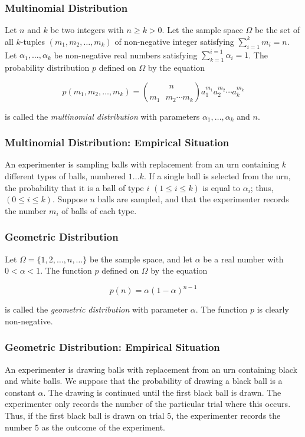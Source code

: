 \documentclass[12pt]{article}
\begin{document}
\subsubsection*{Multinomial Distribution}
\noindent
Let $n$ and $k$ be two integers with $n \geq k > 0$. Let the sample space $\Omega$ be the set of all $k$-tuples $(m_1, m_2, \ldots, m_k)$ of non-negative integer satisfying $\sum_{i=1}^{k} m_i=n$. Let $\alpha_1, \ldots, \alpha_k$ be non-negative real numbers satisfying $\sum_{k=1}^{i=1} \alpha_i = 1$. The probability distribution $p$ defined on $\Omega$ by the equation

\begin{equation*}
p(m_1, m_2, \ldots, m_k) = {n \choose m_1 \text{ } m_2 \cdots m_k } a_1^{m_1} a_2^{m_2} \cdots a_k^{m_k}
\end{equation*}

\noindent
is called the \textit{multinomial distribution} with parameters $\alpha_1, \ldots, \alpha_k$ and $n$.

\subsubsection*{Multinomial Distribution: Empirical Situation}
\noindent
An experimenter is sampling balls with replacement from an urn containing $k$ different types of balls, numbered $1 \ldots k$. If a single ball is selected from the urn, the probability that it is a ball of type $i$ $(1 \leq i \leq k)$ is equal to $\alpha_i$; thus, $(0 \leq i \leq k)$. Suppose $n$ balls are sampled, and that the experimenter records the number $m_i$ of balls of each type.

\subsubsection*{Geometric Distribution}
\noindent
Let $\Omega = \{ 1, 2, \ldots, n, \ldots \}$ be the sample space, and let $\alpha$ be a real number with $0 < \alpha < 1$. The function $p$ defined on $\Omega$ by the equation

\begin{equation*}
p(n) = \alpha ( 1-\alpha )^{n-1}
\end{equation*}

\noindent
is called the \textit{geometric distribution} with parameter $\alpha$. The function $p$ is clearly non-negative.

\subsubsection*{Geometric Distribution: Empirical Situation}
\noindent
An experimenter is drawing balls with replacement from an urn containing black and white balls. We suppose that the probability of drawing a black ball is a constant $\alpha$. The drawing is continued until the first black ball is drawn. The experimenter only records the number of the particular trial where this occurs. Thus, if the first black ball is drawn on trial $5$, the experimenter records the number $5$ as the outcome of the experiment.
 
\end{document}

